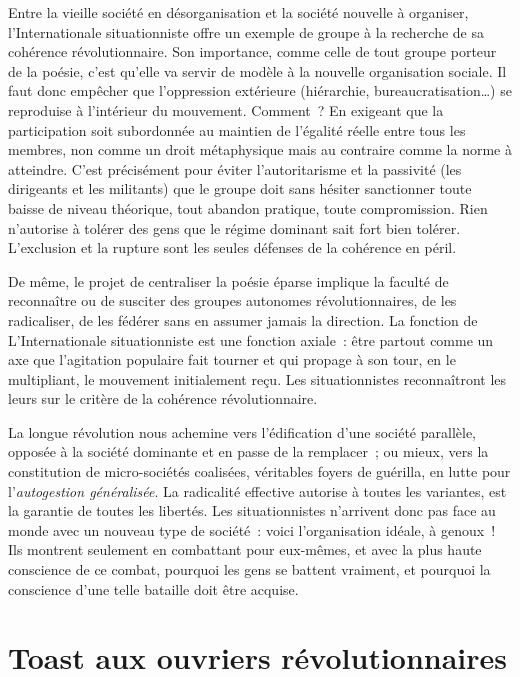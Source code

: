 \documentclass[french,twoside]{book} %
\newcommand{\dateline}[1]{\medskip{\RaggedLeft{#1}\par}\bigskip}
\begin{document}
Entre la vieille société en désorganisation et la société nouvelle à organiser, l’Internationale situationniste offre un exemple de groupe à la recherche de sa cohérence révolutionnaire. Son importance, comme celle de tout groupe porteur de la poésie, c’est qu’elle va servir de modèle à la nouvelle organisation sociale. Il faut donc empêcher que l’oppression extérieure (hiérarchie, bureaucratisation…) se reproduise à l’intérieur du mouvement. Comment ? En exigeant que la participation soit subordonnée au maintien de l’égalité réelle entre tous les membres, non comme un droit métaphysique mais au contraire comme la norme à atteindre. C’est précisément pour éviter l’autoritarisme et la passivité (les dirigeants et les militants) que le groupe doit sans hésiter sanctionner toute baisse de niveau théorique, tout abandon pratique, toute compromission. Rien n’autorise à tolérer des gens que le régime dominant sait fort bien tolérer. L’exclusion et la rupture sont les seules défenses de la cohérence en péril.\par
De même, le projet de centraliser la poésie éparse implique la faculté de reconnaître ou de susciter des groupes autonomes révolutionnaires, de les radicaliser, de les fédérer sans en assumer jamais la direction. La fonction de L’Internationale situationniste est une fonction axiale : être partout comme un axe que l’agitation populaire fait tourner et qui propage à son tour, en le multipliant, le mouvement initialement reçu. Les situationnistes reconnaîtront les leurs sur le critère de la cohérence révolutionnaire.\par
La longue révolution nous achemine vers l’édification d’une société parallèle, opposée à la société dominante et en passe de la remplacer ; ou mieux, vers la constitution de micro-sociétés coalisées, véritables foyers de guérilla, en lutte pour l’\emph{autogestion généralisée}. La radicalité effective autorise à toutes les variantes, est la garantie de toutes les libertés. Les situationnistes n’arrivent donc pas face au monde avec un nouveau type de société : voici l’organisation idéale, à genoux ! Ils montrent seulement en combattant pour eux-mêmes, et avec la plus haute conscience de ce combat, pourquoi les gens se battent vraiment, et pourquoi la conscience d’une telle bataille doit être acquise.\par

\dateline{(1963-1965)}
\section[{Toast aux ouvriers révolutionnaires}]{Toast aux ouvriers révolutionnaires}\renewcommand{\leftmark}{Toast aux ouvriers révolutionnaires}
\end{document}
